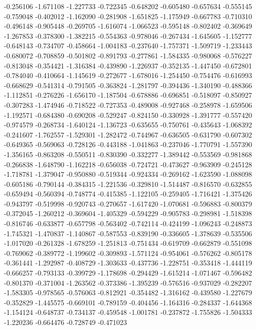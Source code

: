 -0.256106
-1.671108
-1.227733
-0.722345
-0.648202
-0.605480
-0.657634
-0.555145
-0.759048
-0.402012
-1.162090
-0.281908
-1.651825
-1.175949
-0.667783
-0.710310
-0.496148
-0.905448
-0.269705
-1.616074
-1.066523
-0.595148
-0.802402
-0.369649
-1.267853
-0.378300
-1.382215
-0.554363
-0.978046
-0.267434
-1.645605
-1.152777
-0.648143
-0.734707
-0.458664
-1.004183
-0.237640
-1.757371
-1.509719
-1.233443
-0.680072
-0.708859
-0.501802
-0.891793
-0.277861
-1.584335
-0.980068
-0.576227
-0.813048
-0.354421
-1.316384
-0.439890
-1.226937
-0.352135
-1.447450
-0.672801
-0.784040
-0.410664
-1.145619
-0.272677
-1.678016
-1.254450
-0.754476
-0.616993
-0.668629
-0.541314
-0.791505
-0.363824
-1.281797
-0.394436
-1.340190
-0.488366
-1.112851
-0.276226
-1.656170
-1.187504
-0.678886
-0.696851
-0.518097
-0.850927
-0.307283
-1.474946
-0.718522
-0.727353
-0.489008
-0.927468
-0.258978
-1.659506
-1.192571
-0.684380
-0.690208
-0.529247
-0.824150
-0.330928
-1.391777
-0.557420
-0.974579
-0.268734
-1.640124
-1.136723
-0.635655
-0.750761
-0.435643
-1.068392
-0.241607
-1.762557
-1.529301
-1.282472
-0.744967
-0.636505
-0.631790
-0.607302
-0.649365
-0.569063
-0.728126
-0.443188
-1.041863
-0.237046
-1.770791
-1.557390
-1.356165
-0.863208
-0.550511
-0.830390
-0.332277
-1.389442
-0.553569
-0.981868
-0.266838
-1.648790
-1.162218
-0.656038
-0.724721
-0.473627
-0.963909
-0.245128
-1.718781
-1.379047
-0.950880
-0.519344
-0.924334
-0.269162
-1.623590
-1.088098
-0.605186
-0.790144
-0.384315
-1.221536
-0.329810
-1.514487
-0.816570
-0.632855
-0.659494
-0.560394
-0.748774
-0.415385
-1.122105
-0.259405
-1.716421
-1.375426
-0.943797
-0.519998
-0.920743
-0.270657
-1.617420
-1.070681
-0.596883
-0.800379
-0.372045
-1.260212
-0.369604
-1.405329
-0.594229
-0.905783
-0.298981
-1.518398
-0.816746
-0.633877
-0.657798
-0.563402
-0.742114
-0.424199
-1.096243
-0.248873
-1.745321
-1.470837
-1.140867
-0.587553
-0.839190
-0.336605
-1.378639
-0.535506
-1.017020
-0.261328
-1.678259
-1.251813
-0.751434
-0.619709
-0.662879
-0.551098
-0.769062
-0.389772
-1.199602
-0.309893
-1.571124
-0.954061
-0.576262
-0.805178
-0.361441
-1.292987
-0.408729
-1.303633
-0.437736
-1.228751
-0.353418
-1.444119
-0.666257
-0.793133
-0.399729
-1.178698
-0.294429
-1.615214
-1.071467
-0.596482
-0.801370
-0.371004
-1.263562
-0.373386
-1.395239
-0.576516
-0.937029
-0.282207
-1.583305
-0.978565
-0.576063
-0.812921
-0.354482
-1.316162
-0.439580
-1.227679
-0.352829
-1.445575
-0.669101
-0.789159
-0.404456
-1.164316
-0.284337
-1.644368
-1.154124
-0.648737
-0.734137
-0.459548
-1.001781
-0.237872
-1.755826
-1.504333
-1.220236
-0.664476
-0.728749
-0.471023

